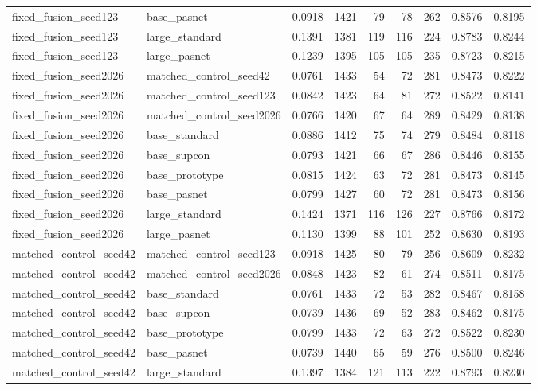 \begin{tabular}{llrrrrrrr}
fixed\_fusion\_seed123 & base\_pasnet & 0.0918 & 1421 & 79 & 78 & 262 & 0.8576 & 0.8195 \\
fixed\_fusion\_seed123 & large\_standard & 0.1391 & 1381 & 119 & 116 & 224 & 0.8783 & 0.8244 \\
fixed\_fusion\_seed123 & large\_pasnet & 0.1239 & 1395 & 105 & 105 & 235 & 0.8723 & 0.8215 \\
fixed\_fusion\_seed2026 & matched\_control\_seed42 & 0.0761 & 1433 & 54 & 72 & 281 & 0.8473 & 0.8222 \\
fixed\_fusion\_seed2026 & matched\_control\_seed123 & 0.0842 & 1423 & 64 & 81 & 272 & 0.8522 & 0.8141 \\
fixed\_fusion\_seed2026 & matched\_control\_seed2026 & 0.0766 & 1420 & 67 & 64 & 289 & 0.8429 & 0.8138 \\
fixed\_fusion\_seed2026 & base\_standard & 0.0886 & 1412 & 75 & 74 & 279 & 0.8484 & 0.8118 \\
fixed\_fusion\_seed2026 & base\_supcon & 0.0793 & 1421 & 66 & 67 & 286 & 0.8446 & 0.8155 \\
fixed\_fusion\_seed2026 & base\_prototype & 0.0815 & 1424 & 63 & 72 & 281 & 0.8473 & 0.8145 \\
fixed\_fusion\_seed2026 & base\_pasnet & 0.0799 & 1427 & 60 & 72 & 281 & 0.8473 & 0.8156 \\
fixed\_fusion\_seed2026 & large\_standard & 0.1424 & 1371 & 116 & 126 & 227 & 0.8766 & 0.8172 \\
fixed\_fusion\_seed2026 & large\_pasnet & 0.1130 & 1399 & 88 & 101 & 252 & 0.8630 & 0.8193 \\
matched\_control\_seed42 & matched\_control\_seed123 & 0.0918 & 1425 & 80 & 79 & 256 & 0.8609 & 0.8232 \\
matched\_control\_seed42 & matched\_control\_seed2026 & 0.0848 & 1423 & 82 & 61 & 274 & 0.8511 & 0.8175 \\
matched\_control\_seed42 & base\_standard & 0.0761 & 1433 & 72 & 53 & 282 & 0.8467 & 0.8158 \\
matched\_control\_seed42 & base\_supcon & 0.0739 & 1436 & 69 & 52 & 283 & 0.8462 & 0.8175 \\
matched\_control\_seed42 & base\_prototype & 0.0799 & 1433 & 72 & 63 & 272 & 0.8522 & 0.8230 \\
matched\_control\_seed42 & base\_pasnet & 0.0739 & 1440 & 65 & 59 & 276 & 0.8500 & 0.8246 \\
matched\_control\_seed42 & large\_standard & 0.1397 & 1384 & 121 & 113 & 222 & 0.8793 & 0.8230 \\

\end{tabular}
